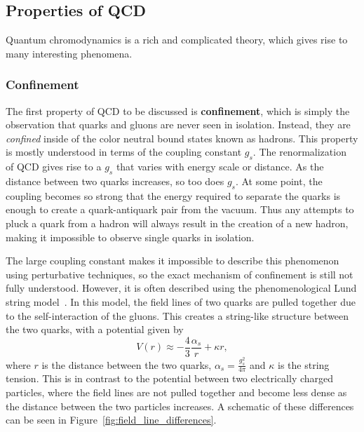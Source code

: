 \subsection{Properties of QCD}
\label{sec:qcd_features}

Quantum chromodynamics is a rich and complicated theory, which gives rise to many interesting phenomena.

\subsubsection{Confinement}
\label{sec:qcd_confinement}

The first property of QCD to be discussed is \textbf{confinement}, which is simply the observation that quarks and gluons are never seen in isolation. Instead, they are \textit{confined} inside of the color neutral bound states known as hadrons. This property is mostly understood in terms of the coupling constant $g_{s}$. The renormalization~\cite{QCDRenorm} of QCD gives rise to a $g_{s}$ that varies with energy scale or distance. As the distance between two quarks increases, so too does $g_{s}$. At some point, the coupling becomes so strong that the energy required to separate the quarks is enough to create a quark-antiquark pair from the vacuum. Thus any attempts to pluck a quark from a hadron will always result in the creation of a new hadron, making it impossible to observe single quarks in isolation. 

The large coupling constant makes it impossible to describe this phenomenon using perturbative techniques, so the exact mechanism of confinement is still not fully understood. However, it is often described using the phenomenological Lund string model~\cite{LundString}. In this model, the field lines of two quarks are pulled together due to the self-interaction of the gluons. This creates a string-like structure between the two quarks, with a potential given by 
%
\begin{equation}
    \label{eq:lund_potential}
    V(r) \approx -\frac{4}{3}\frac{\alpha_s}{r} + \kappa r,
\end{equation}
%
where $r$ is the distance between the two quarks, $\alpha_s = \frac{g_s^2}{4\pi}$ and $\kappa$ is the string tension. This is in contrast to the potential between two electrically charged particles, where the field lines are not pulled together and become less dense as the distance between the two particles increases. A schematic of these differences can be seen in Figure~\ref{fig:field_line_differences}.

